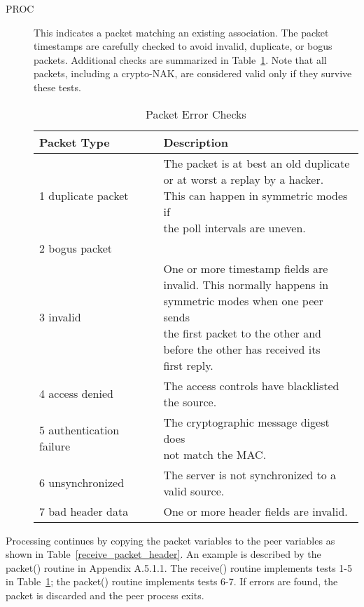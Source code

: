 \begin{description}
  \item[PROC] This indicates a packet matching an existing association. The
    packet timestamps are carefully checked to avoid invalid, duplicate,
    or bogus packets. Additional checks are summarized in Table~\ref{packet_error_checks}.
    Note that all packets, including a crypto-NAK, are considered valid
    only if they survive these tests.

    \begin{table}[htb]
    \center
    \begin{tabular}{| l | l |}
    \hline
    Packet Type & Description \\
    \hline
    \hline
    1 duplicate packet & \makecell[l]{The packet is at best an old duplicate \\ or at worst a replay by a hacker. \\ This can happen in symmetric modes if \\ the poll intervals are uneven.} \\
    2 bogus packet & \\
    3 invalid & \makecell[l]{One or more timestamp fields are \\ invalid. This normally happens in \\ symmetric modes when one peer sends \\ the first packet to the other and \\ before the other has received its \\ first reply.} \\
    4 access denied & \makecell[l]{The access controls have blacklisted \\ the source.} \\
    5 authentication failure & \makecell[l]{The cryptographic message digest does \\ not match the MAC.} \\
    6 unsynchronized & \makecell[l]{The server is not synchronized to a \\ valid source.} \\
    7 bad header data & One or more header fields are invalid. \\
    \hline
    \end{tabular}
    \caption{Packet Error Checks}
    \label{packet_error_checks}
    \end{table}

\end{description}

Processing continues by copying the packet variables to the peer
variables as shown in Table~\ref{receive_packet_header}. An example is described by the
packet() routine in Appendix A.5.1.1. The receive() routine
implements tests 1-5 in Table~\ref{packet_error_checks}; the packet() routine implements
tests 6-7. If errors are found, the packet is discarded and the peer
process exits.

